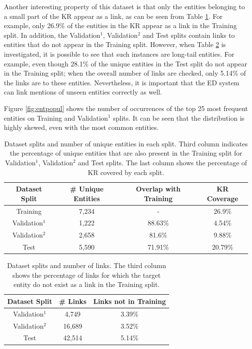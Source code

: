 \documentclass{report}
\theoremstyle{definition}
\theoremstyle{remark}
\begin{document}
Another interesting property of this dataset is that only the entities belonging to a small part of the KR appear as a link, as can be seen from Table \ref{tab:goldstatsed2}. For example, only 26.9\% of the entities in the KR appear as a link in the Training split. In addition, the  Validation$^1$, Validation$^2$ and Test splits contain links to entities that do not appear in the Training split. However, when  Table \ref{tab:goldstatsed3} is investigated, it is possible to see that such instances are long-tail entities. For example, even though 28.1\% of the unique entities in the Test split do not appear in the Training split; when the overall number of links are checked, only 5.14\% of the links are to these entities. Nevertheless, it is important that the ED system can link mentions of unseen entities correctly as well.


Figure \ref{fig:entpopul} shows the number of occurrences of the top 25 most frequent entities on Training and Validation$^1$ splits. It can be seen that the distribution is highly skewed, even with the most common entities. 

\begin{table}
    \centering
    \begin{tabular}{cccc}
    Dataset Split & \# Unique Entities & Overlap with Training & KR Coverage\\
    \hline
    Training & 7,234 & - & 26.9\%\\
    Validation$^1$ & 1,222 & 88.63\% & 4.54\%\\
    Validation$^2$ & 2,658 & 81.6\% & 9.88\%\\
    Test & 5,590 & 71.91\%& 20.79\%\\
    \end{tabular}
    \caption{Dataset splits and number of unique entities in each split. Third column indicates the percentage of unique entities that are also present in the Training split for Validation$^1$, Validation$^2$ and Test splits. The last column shows the percentage of KR covered by each split.}
    \label{tab:goldstatsed2}
\end{table}

\begin{table}
    \centering
    \begin{tabular}{ccc}
    Dataset Split & \# Links & Links not in Training\\
    \hline
    Validation$^1$ & 4,749 & 3.39\% \\
    Validation$^2$ & 16,689 & 3.52\% \\
    Test & 42,514 & 5.14\% \\
    \end{tabular}
    \caption{Dataset splits and number of links. The third column shows the percentage of links for which the target entity do not exist as a link in the Training split.}
    \label{tab:goldstatsed3}
\end{table}
\end{document}
